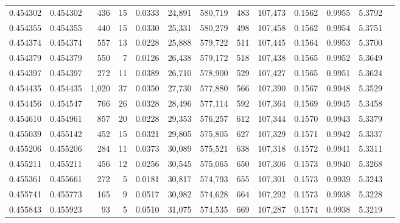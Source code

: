 \begin{tabular}{rrrrrrrrrrrrr}
0.454302 & 0.454302 &   436 &    15 &                                     0.0333 &  24,891 & 580,719 &     483 & 107,473 & 0.1562 & 0.9955 & 5.3792 \\
0.454355 & 0.454355 &   440 &    15 &                                     0.0330 &  25,331 & 580,279 &     498 & 107,458 & 0.1562 & 0.9954 & 5.3751 \\
0.454374 & 0.454374 &   557 &    13 &                                     0.0228 &  25,888 & 579,722 &     511 & 107,445 & 0.1564 & 0.9953 & 5.3700 \\
0.454379 & 0.454379 &   550 &     7 &                                     0.0126 &  26,438 & 579,172 &     518 & 107,438 & 0.1565 & 0.9952 & 5.3649 \\
0.454397 & 0.454397 &   272 &    11 &                                     0.0389 &  26,710 & 578,900 &     529 & 107,427 & 0.1565 & 0.9951 & 5.3624 \\
0.454435 & 0.454435 & 1,020 &    37 &                                     0.0350 &  27,730 & 577,880 &     566 & 107,390 & 0.1567 & 0.9948 & 5.3529 \\
0.454456 & 0.454547 &   766 &    26 &                                     0.0328 &  28,496 & 577,114 &     592 & 107,364 & 0.1569 & 0.9945 & 5.3458 \\
0.454610 & 0.454961 &   857 &    20 &                                     0.0228 &  29,353 & 576,257 &     612 & 107,344 & 0.1570 & 0.9943 & 5.3379 \\
0.455039 & 0.455142 &   452 &    15 &                                     0.0321 &  29,805 & 575,805 &     627 & 107,329 & 0.1571 & 0.9942 & 5.3337 \\
0.455206 & 0.455206 &   284 &    11 &                                     0.0373 &  30,089 & 575,521 &     638 & 107,318 & 0.1572 & 0.9941 & 5.3311 \\
0.455211 & 0.455211 &   456 &    12 &                                     0.0256 &  30,545 & 575,065 &     650 & 107,306 & 0.1573 & 0.9940 & 5.3268 \\
0.455361 & 0.455661 &   272 &     5 &                                     0.0181 &  30,817 & 574,793 &     655 & 107,301 & 0.1573 & 0.9939 & 5.3243 \\
0.455741 & 0.455773 &   165 &     9 &                                     0.0517 &  30,982 & 574,628 &     664 & 107,292 & 0.1573 & 0.9938 & 5.3228 \\
0.455843 & 0.455923 &    93 &     5 &                                     0.0510 &  31,075 & 574,535 &     669 & 107,287 & 0.1574 & 0.9938 & 5.3219 \\

\end{tabular}
